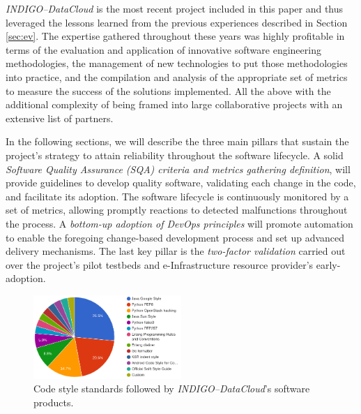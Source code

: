 \documentclass[journal]{IEEEtran}
\begin{document}
{\sl INDIGO--DataCloud} is the most recent project included in this paper and thus
leveraged the lessons learned from the previous experiences described in
Section \ref{sec:ev}. The expertise gathered throughout these years was highly
profitable in terms of the evaluation and application of innovative software engineering
methodologies, the management of new technologies to put those methodologies
into practice, and the compilation and analysis of the appropriate set of metrics to measure the
success of the solutions implemented. All the above with the additional complexity of being framed into
large collaborative projects with an extensive list of partners.

In the following sections, we will describe the three main pillars that sustain the project's strategy to attain reliability throughout the
software lifecycle. A solid \textit{Software Quality Assurance (SQA) criteria
and metrics gathering definition}, will provide guidelines to develop quality
software, validating each change in the code, and facilitate its adoption. The software lifecycle is continuously monitored
by a set of metrics, allowing promptly reactions to detected malfunctions throughout the
process. A \textit{bottom-up adoption of DevOps principles} will promote automation to enable
the foregoing change-based development process and set up advanced delivery mechanisms.
The last key pillar is the \textit{two-factor validation} carried out over the project's pilot testbeds and
e-Infrastructure resource provider's early-adoption.



\begin{figure}[ht]
\centering
\includegraphics[width=0.5\textwidth]{images/codestyle.png}
\caption{Code style standards followed by {\sl INDIGO--DataCloud}'s software products.}
\label{fig:fig_codestyle}
\end{figure}
\end{document}
